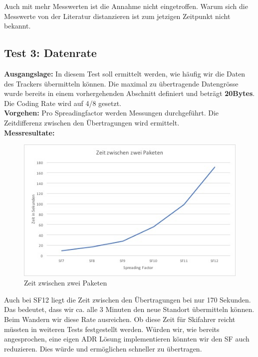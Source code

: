 \documentclass[11pt,english,german]{report}
\theoremstyle{definition}
\begin{document}
\noindent
Auch mit mehr Messwerten ist die Annahme nicht eingetroffen. Warum sich die Messwerte von der Literatur distanzieren ist zum jetzigen Zeitpunkt nicht bekannt.

\newpage
\subsection{Test 3: Datenrate}
\textbf{Ausgangslage:} In diesem Test soll ermittelt werden, wie häufig wir die Daten des Trackers übermitteln können. Die maximal zu übertragende Datengrösse wurde bereits in einem vorhergehenden Abschnitt definiert und beträgt \textbf{20Bytes}. Die Coding Rate wird auf 4/8 gesetzt.\\[0.3cm]
\textbf{Vorgehen:} Pro Spreadingfactor werden Messungen durchgeführt. Die Zeitdifferenz zwischen den Übertragungen wird ermittelt.\\[0.3cm]
\textbf{Messresultate:} 
\begin{figure}[H]
	\centering
	\includegraphics[width=\textwidth]{img/testing/timebetweenpakets.jpg}
	\caption[Zeit zwischen zwei Paketen]
	{Zeit zwischen zwei Paketen}
\end{figure}
\noindent
Auch bei SF12 liegt die Zeit zwischen den Übertragungen bei nur 170 Sekunden. Das bedeutet, dass wir ca. alle 3 Minuten den neue Standort übermitteln können. Beim Wandern wir diese Rate ausreichen. Ob diese Zeit für Skifahrer reicht müssten in weiteren Tests festgestellt werden. Würden wir, wie bereits angesprochen, eine eigen ADR Lösung implementieren könnten wir den SF auch reduzieren. Dies würde und ermöglichen schneller zu übertragen.

\newpage
\end{document}
